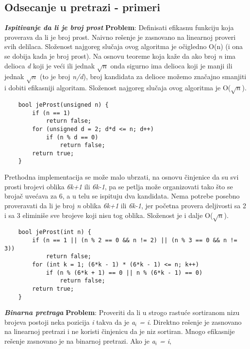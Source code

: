 \documentclass{article}
\begin{document}
\subsection{Odsecanje u pretrazi - primeri}
\textit{\textbf{Ispitivanje da li je broj prost}}
\newline \textbf{Problem}: Definisati efikasnu funkciju koja proverava da li je broj prost.
\newline Naivno rešenje je zasnovano na linearnoj proveri svih delilaca. Složenost najgoreg slučaja ovog algoritma je očigledno O(n) (i ona se dobija
kada je broj prost).
\newline Na osnovu teoreme koja kaže da ako broj \textit{n} ima delioca \textit{d} koji je veći ili jednak
$\sqrt{n}$ onda sigurno ima delioca koji je manji ili jednak $\sqrt{n}$ (to je broj \textit{n/d}), broj
kandidata za delioce možemo značajno smanjiti i dobiti efikasniji algoritam. Složenost najgoreg slučaja ovog algoritma je O($\sqrt{n}$).
\begin{lstlisting}
    bool jeProst(unsigned n) {
        if (n == 1) 
            return false;
        for (unsigned d = 2; d*d <= n; d++)
            if (n % d == 0)
                return false;
        return true;
    }
\end{lstlisting}
Prethodna implementacija se može malo ubrzati, na osnovu činjenice da su svi
prosti brojevi oblika \textit{6k+1} ili \textit{6k-1}, pa se petlja može organizovati tako što se brojač uvećava za 6, a u telu se ispituju
dva kandidata. Nema potrebe posebno proveravati da li je broj \textit{n}
oblika \textit{6k+1} ili \textit{6k-1}, jer početna provera deljivosti sa 2 i sa 3 eliminiše sve
brojeve koji nisu tog oblika. Složenost je i dalje O($\sqrt{n}$).
\begin{lstlisting}
    bool jeProst(int n) {
        if (n == 1 || (n % 2 == 0 && n != 2) || (n % 3 == 0 && n != 3))
            return false;
        for (int k = 1; (6*k - 1) * (6*k - 1) <= n; k++)
            if (n % (6*k + 1) == 0 || n % (6*k - 1) == 0)
                return false;
        return true;
    }
\end{lstlisting}
\vspace{0.2cm}
\textit{\textbf{Binarna pretraga}}
\newline 
\textbf{Problem}: Proveriti da li u strogo rastuće sortiranom nizu brojeva postoji neka
pozicija \textit{i} takva da je \textit{a$_i$ = i}.
\newline 
Direktno rešenje je zasnovano na linearnoj pretrazi i ne koristi činjenicu da je
niz sortiran.
\newline Mnogo efikasnije rešenje zasnovano je na binarnoj pretrazi. Ako je \textit{a$_i$ = i},
\end{document}
